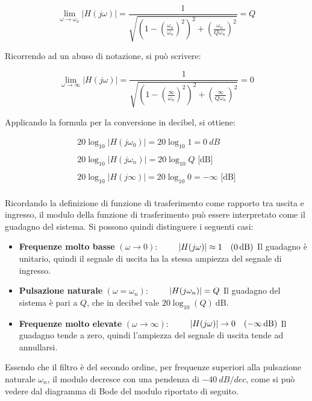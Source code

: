 \begin{equation}
    \lim_{\omega \to \omega_n} |H(j\omega)| = \frac{1}{\sqrt{\left(1-\left(\frac{\omega_n}{\omega_n}\right)^2\right)^2 + \left(\frac{\omega_n}{Q\omega_n}\right)^2}} = Q
    \label{eq: lim w wn LP}
\end{equation}

Ricorrendo ad un abuso di notazione, si può scrivere:

\begin{equation}
    \lim_{\omega \to \infty} |H(j\omega)| = \frac{1}{\sqrt{\left(1-\left(\frac{\infty}{\omega_n}\right)^2\right)^2 + \left(\frac{\infty}{Q\omega_n}\right)^2}} = 0
    \label{eq: lim w infty LP}
\end{equation}

Applicando la formula per la conversione in decibel, si ottiene:

\begin{equation}
    \begin{aligned}
    20\log_{10} |H(j\omega_0)| = 20\log_{10} 1 = \SI{0}{dB} \\\\
    20\log_{10} |H(j\omega_n)| = 20\log_{10} Q \text{ [dB]} \\\\
    20\log_{10} |H(j\infty)| = 20\log_{10} 0 = -\infty \text{ [dB]}\\
    \end{aligned}
    \label{eq: log modulo LP}
\end{equation}

Ricordando la definizione di funzione di trasferimento come rapporto tra uscita e ingresso, 
il modulo della funzione di trasferimento può essere interpretato come il guadagno del sistema. 
Si possono quindi distinguere i seguenti casi:

\begin{itemize}
    \item \textbf{Frequenze molto basse} $(\omega \to 0):\qquad$
    \(
    |H(j\omega)| \approx 1 \quad (0\,\text{dB})\\
    \)
    Il guadagno è unitario, quindi il segnale di uscita ha la stessa ampiezza del segnale di ingresso.

    \item \textbf{Pulsazione naturale} $(\omega = \omega_n):\qquad$
    \(
    |H(j\omega_n)| = Q\\
    \)
    Il guadagno del sistema è pari a $Q$, che in decibel vale
    \(
    20\log_{10}(Q)\ \text{dB}.
    \)

    \item \textbf{Frequenze molto elevate} $(\omega \to \infty):\qquad$
    \(
    |H(j\omega)| \to 0 \quad (-\infty\,\text{dB})\\
    \)
    Il guadagno tende a zero, quindi l'ampiezza del segnale di uscita tende ad annullarsi.
\end{itemize}Essendo che il filtro è del secondo ordine, per frequenze superiori alla pulsazione naturale $\omega_n$, il modulo decresce con una pendenza di $\SI{-40}{dB/dec}$, come si può vedere dal diagramma di Bode del modulo riportato di seguito.


